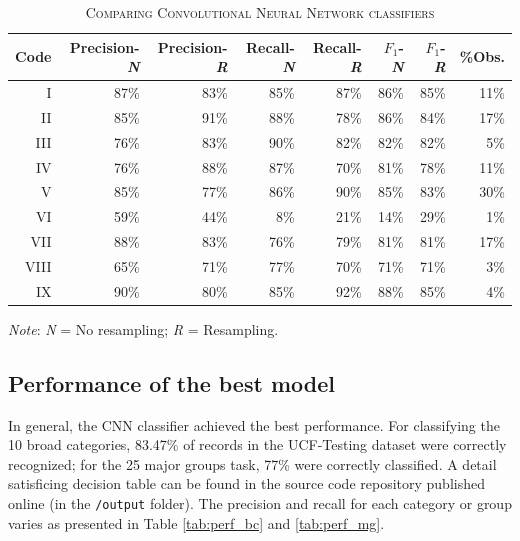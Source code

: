 \documentclass[11pt]{article}
\begin{document}
\begin{table}
\centering
\begin{threeparttable}
    \caption{\textsc{Comparing Convolutional Neural Network classifiers}} \label{tab:perf_compare}
    \begin{tabular}{r|r|r|r|r|r|r|r}
		\hline
			Code & Precision-\textit{N} & Precision-\textit{R} & Recall-\textit{N} & Recall-\textit{R} & $F_1$-\textit{N} & $F_1$-\textit{R} & \%Obs.\\
		\hline
			I & 87\% & 83\% & 85\% & 87\% & 86\% & 85\% & 11\% \\
			II & 85\% & 91\% & 88\% & 78\% & 86\% & 84\% & 17\% \\
			III & 76\% & 83\% & 90\% & 82\% & 82\% & 82\% & 5\% \\
			IV & 76\% & 88\% & 87\% & 70\% & 81\% & 78\% & 11\% \\
			V & 85\% & 77\% & 86\% & 90\% & 85\% & 83\% & 30\% \\
			VI & 59\% & 44\% & 8\% & 21\% & 14\% & 29\% & 1\% \\
			VII & 88\% & 83\% & 76\% & 79\% & 81\% & 81\% & 17\% \\
			VIII & 65\% & 71\% & 77\% & 70\% & 71\% & 71\% & 3\% \\
			IX & 90\% & 80\% & 85\% & 92\% & 88\% & 85\% & 4\% \\
    	 \hline
    \end{tabular}
\begin{tablenotes}
\footnotesize
\item \emph{Note}: \textit{N} = No resampling; \textit{R} = Resampling.
\end{tablenotes}
\end{threeparttable}
\end{table}



\subsection{Performance of the best model}

In general, the CNN classifier achieved the best performance. For classifying the 10 broad categories, 83.47\% of records in the UCF-Testing dataset were correctly recognized; for the 25 major groups task, 77\% were correctly classified. A detail satisficing decision table can be found in the source code repository published online (in the \texttt{/output} folder). The precision and recall for each category or group varies as presented in Table \ref{tab:perf_bc} and \ref{tab:perf_mg}. 
\end{document}
